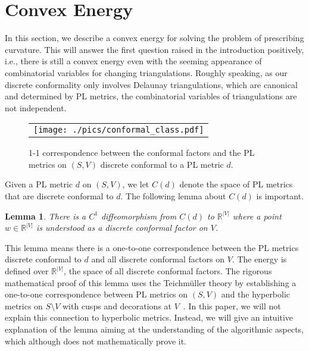 \documentclass[11pt]{article}
\newtheorem{lemma}[theorem]{Lemma}
\begin{document}
\section{Convex Energy}
\label{sec:convexenergy}
In this section, we describe a convex energy for solving the problem of prescribing curvature.  
This will answer the first question raised in the introduction positively, i.e.,  there is
still a convex energy even with the seeming appearance of combinatorial variables for changing 
triangulations. Roughly speaking, as our discrete conformality only involves Delaunay
triangulations, which are canonical and determined by PL metrics, the combinatorial variables
of triangulations are not independent. 

\begin{figure}[t]
\begin{center}
\begin{tabular}{c}
\texttt{[image: ./pics/conformal\_class.pdf]}
\end{tabular}
\end{center}
\vspace{-0.1in}
\caption{1-1 correspondence between the conformal factors and the PL metrics on $(S, V)$ discrete 
conformal to a PL metric $d$. 
\label{fig:conformal_class}}
\end{figure}


Given a PL metric $d$ on $(S, V)$, we let $C(d)$ denote the space of PL metrics that
are discrete conformal to $d$. The following lemma about $C(d)$ is important. 
\begin{lemma}
\label{lem:conformalmetricspace}
There is a $C^1$ diffeomorphism from $C(d)$ to $\mathbb{R}^{|V|}$ where a point $w \in \mathbb{R}^{|V|}$ is 
understood as a discrete conformal factor on $V$. 
\end{lemma}
This lemma means there is a one-to-one correspondence between the PL metrics
discrete conformal to $d$ and all discrete conformal factors on $V$.
The energy is defined over $\mathbb{R}^{|V|}$, the space of all discrete conformal factors.  
The rigorous mathematical proof of this lemma uses the Teichm\"uller theory by 
establishing a one-to-one correspondence between PL metrics on $(S, V)$ and the 
hyperbolic metrics on $S\setminus V$ with cusps and 
decorations at $V$~\cite{glsw1}. In this paper, we will not explain this 
connection to hyperbolic metrics. Instead, we will give an intuitive explanation of
the lemma aiming at the understanding of the algorithmic aspects, which although does not 
mathematically prove it. 
\end{document}
